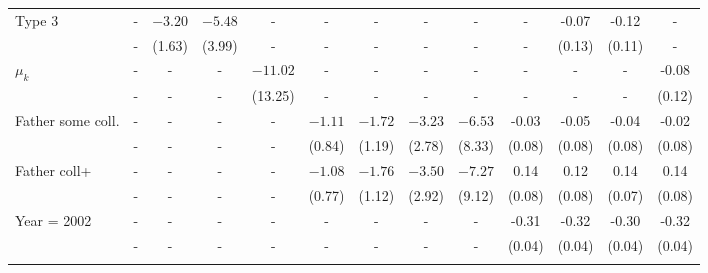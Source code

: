 \begin{tabular}{lcccccccccccc}
Type 3&-&$-3.20$&$-5.48$&-&-&-&-&-&-&-0.07&-0.12&-\\
&-&(1.63)&(3.99)&-&-&-&-&-&-&(0.13)&(0.11)&-\\
$\mu_{k}$&-&-&-&$-11.02$&-&-&-&-&-&-&-&-0.08\\
&-&-&-&(13.25)&-&-&-&-&-&-&-&(0.12)\\
Father some coll.&-&-&-&-&$-1.11$&$-1.72$&$-3.23$&$-6.53$&-0.03&-0.05&-0.04&-0.02\\
&-&-&-&-&(0.84)&(1.19)&(2.78)&(8.33)&(0.08)&(0.08)&(0.08)&(0.08)\\
Father coll+&-&-&-&-&$-1.08$&$-1.76$&$-3.50$&$-7.27$&0.14&0.12&0.14&0.14\\
&-&-&-&-&(0.77)&(1.12)&(2.92)&(9.12)&(0.08)&(0.08)&(0.07)&(0.08)\\
Year = 2002&-&-&-&-&-&-&-&-&-0.31&-0.32&-0.30&-0.32\\
&-&-&-&-&-&-&-&-&(0.04)&(0.04)&(0.04)&(0.04)\\
\\
\bottomrule\end{tabular}